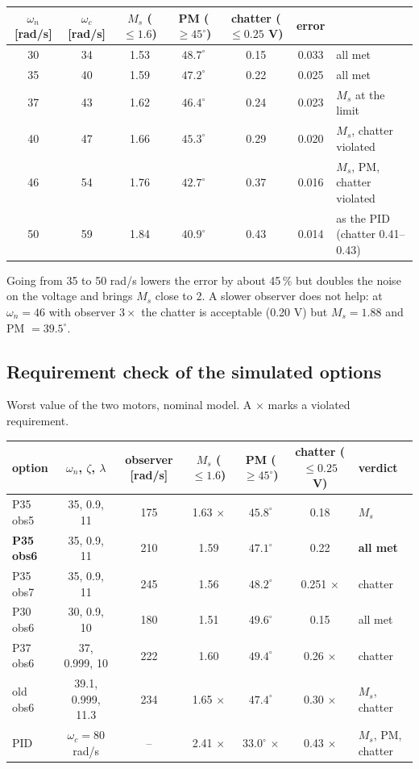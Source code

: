 \documentclass[10pt,a4paper]{article}
\begin{document}
{\small
\begin{tabularx}{\linewidth}{@{}c c c c c c X@{}}
\toprule
$\omega_n$ [rad/s] & $\omega_c$ [rad/s] & $M_s$ ($\leq1.6$) & PM ($\geq45^\circ$) & chatter ($\leq0.25$ V) & error & \\
\midrule
30 & 34 & 1.53 & $48.7^\circ$ & 0.15 & 0.033 & all met \\
35 & 40 & 1.59 & $47.2^\circ$ & 0.22 & 0.025 & all met \\
37 & 43 & 1.62 & $46.4^\circ$ & 0.24 & 0.023 & $M_s$ at the limit \\
40 & 47 & 1.66 & $45.3^\circ$ & 0.29 & 0.020 & $M_s$, chatter violated \\
46 & 54 & 1.76 & $42.7^\circ$ & 0.37 & 0.016 & $M_s$, PM, chatter violated \\
50 & 59 & 1.84 & $40.9^\circ$ & 0.43 & 0.014 & as the PID (chatter 0.41--0.43) \\
\bottomrule
\end{tabularx}}

Going from 35 to 50 rad/s lowers the error by about 45\,\% but doubles the noise on the voltage and brings $M_s$ close to
2. A slower observer does not help: at $\omega_n=46$ with observer $3\times$ the chatter is acceptable (0.20 V) but
$M_s=1.88$ and PM $=39.5^\circ$.

\subsection{Requirement check of the simulated options}
Worst value of the two motors, nominal model. A $\times$ marks a violated requirement.

{\small
\begin{tabularx}{\linewidth}{@{}l c c c c c X@{}}
\toprule
option & $\omega_n$, $\zeta$, $\lambda$ & observer [rad/s] & $M_s$ ($\leq1.6$) & PM ($\geq45^\circ$) & chatter ($\leq0.25$ V) & verdict \\
\midrule
P35 obs5 & 35, 0.9, 11 & 175 & 1.63 $\times$ & $45.8^\circ$ & 0.18 & $M_s$ \\
\textbf{P35 obs6} & 35, 0.9, 11 & 210 & 1.59 & $47.1^\circ$ & 0.22 & \textbf{all met} \\
P35 obs7 & 35, 0.9, 11 & 245 & 1.56 & $48.2^\circ$ & 0.251 $\times$ & chatter \\
P30 obs6 & 30, 0.9, 10 & 180 & 1.51 & $49.6^\circ$ & 0.15 & all met \\
P37 obs6 & 37, 0.999, 10 & 222 & 1.60 & $49.4^\circ$ & 0.26 $\times$ & chatter \\
old obs6 & 39.1, 0.999, 11.3 & 234 & 1.65 $\times$ & $47.4^\circ$ & 0.30 $\times$ & $M_s$, chatter \\
\midrule
PID & $\omega_c=80$ rad/s & -- & 2.41 $\times$ & $33.0^\circ$ $\times$ & 0.43 $\times$ & $M_s$, PM, chatter \\
\bottomrule
\end{tabularx}}
\end{document}
